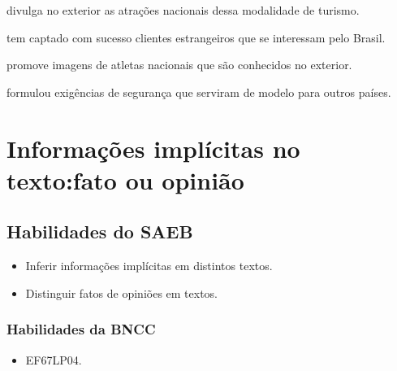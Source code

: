 \begin{escolha}

  \item divulga no exterior as atrações nacionais dessa modalidade de turismo.

  \item tem captado com sucesso clientes estrangeiros que se interessam pelo Brasil.

  \item promove imagens de atletas nacionais que são conhecidos no exterior.

  \item formulou exigências de segurança que serviram de modelo para outros países.

\end{escolha}


\chapter[Informações implícitas no texto: fato ou opinião]{Informações implícitas no texto:\break fato ou opinião}

\section*{Habilidades do SAEB}

\begin{itemize} 

  \item Inferir informações implícitas em distintos textos.

  \item Distinguir fatos de opiniões em textos.

\end{itemize}

\subsection{Habilidades da BNCC}

\begin{itemize} 

  \item EF67LP04.

\end{itemize} 

